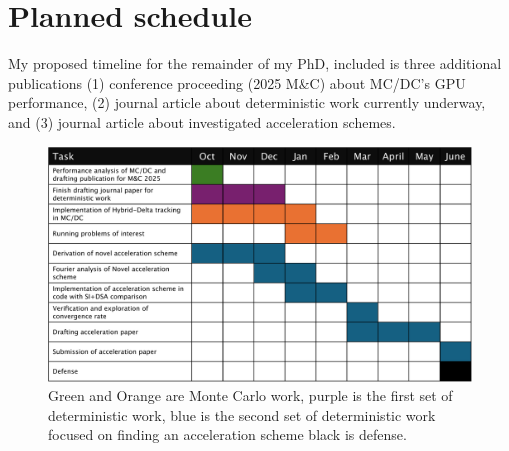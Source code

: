 
\chapter{Planned schedule} 
\label{ch-schedule}

My proposed timeline for the remainder of my PhD, included is three additional publications (1) conference proceeding (2025 M\&C) about MC/DC's GPU performance, (2) journal article about deterministic work currently underway, and (3) journal article about investigated acceleration schemes.

\begin{figure}[ht]
    \centering
    \includegraphics[width=\textwidth]{figures/time_line.pdf}
    \caption{Green and Orange are Monte Carlo work, purple is the first set of deterministic work, blue is the second set of deterministic work focused on finding an acceleration scheme black is defense.}
    \label{fig:gantt}
\end{figure}
